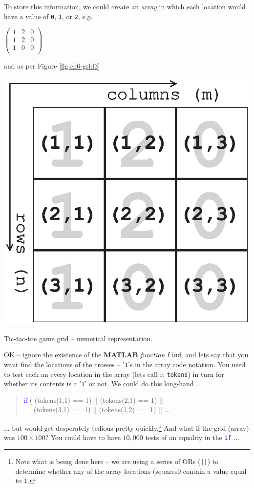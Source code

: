 \documentclass{tufte-book} %
\newenvironment{docspec}{\begin{quotation}\ttfamily\parskip0pt\parindent0pt\ignorespaces}{\end{quotation}}
\begin{document}
To store this information, we could create an \textit{array} in which each location would have a value of \texttt{0}, \texttt{1}, or \texttt{2}, e.g.

\vspace{2mm}
\(\begin{pmatrix}1 & 2 & 0 \\
1 & 2 & 0 \\
1 & 0 & 0 \\
\end{pmatrix}\)
\vspace{2mm}

\noindent and as per Figure \ref{fig:ch6-grid3}

\begin{marginfigure}[0.0in]
\includegraphics[width=\linewidth]{ch6-grid3.eps}
\caption{Tic-tac-toe game grid -- numerical representation.}
\label{fig:ch6-grid3}
\end{marginfigure}

OK -- ignore the existence of the \textbf{MATLAB} \textit{function} \texttt{find}, and lets say that you want find the locations of the crosses -- '\texttt{1}'s in the array code notation. You need to test each an every location in the array (lets call it \texttt{tokens}) in turn for whether its contents is a '\texttt{1}' or not. We could do this long-hand ...
\begin{docspec}
\textcolor{blue}{if} ( (tokens(1,1) == 1) || (tokens(2,1) == 1) ||\\
\ \ \ (tokens(3,1) == 1) || (tokens(1,2) == 1) || ...
\end{docspec}
... but would get desperately tedious pretty quickly.\footnote{Note what is being done here -- we are using a series of ORs (\texttt{||}) to determine whether any of the array locations (squares0 contain a value equal to \texttt{1}.} And what if the grid (array) was \(100\times 100\)? You could have to have \(10,000\) tests of an equality in the \texttt{\textcolor{blue}{if}} ...
\end{document}
